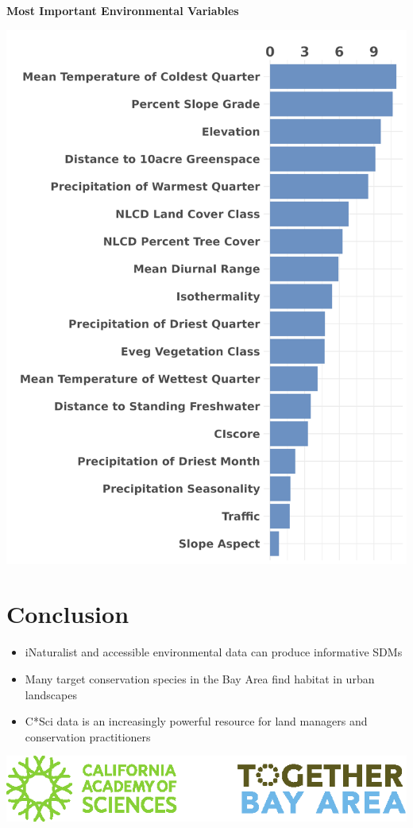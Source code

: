 \documentclass[a0paper,fleqn]{betterposter}
\begin{document}
{\vspace{2cm}
\textbf{Most Important Environmental Variables}
\begin{center}
    \includegraphics[width = \textwidth]{img/predictor.png}
\end{center}

\section{Conclusion}
\vspace{-9mm}
\begin{itemize}
\item iNaturalist and accessible environmental data can produce informative SDMs
\item Many target conservation species in the Bay Area find habitat in urban landscapes
\item C*Sci data is an increasingly powerful resource for land managers and conservation practitioners
\end{itemize}

\vfill

\begin{center}

\includegraphics[width=.8\textwidth]{img/combined_logo.eps}\\
\end{center}
}
\end{document}
